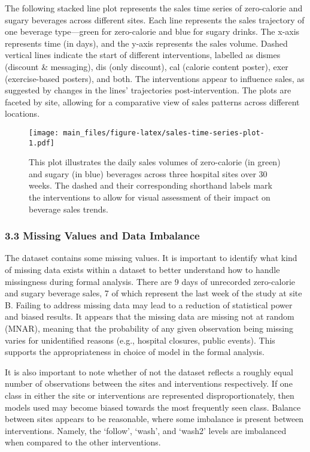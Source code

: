 \documentclass[
]{article}
\begin{document}
The following stacked line plot represents the sales time series of
zero-calorie and sugary beverages across different sites. Each line
represents the sales trajectory of one beverage type---green for
zero-calorie and blue for sugary drinks. The x-axis represents time (in
days), and the y-axis represents the sales volume. Dashed vertical lines
indicate the start of different interventions, labelled as dismes
(discount \& messaging), dis (only discount), cal (calorie content
poster), exer (exercise-based posters), and both. The interventions
appear to influence sales, as suggested by changes in the lines'
trajectories post-intervention. The plots are faceted by site, allowing
for a comparative view of sales patterns across different locations.

\begin{figure}
\centering
\texttt{[image: main\_files/figure-latex/sales-time-series-plot-1.pdf]}
\caption{This plot illustrates the daily sales volumes of zero-calorie
(in green) and sugary (in blue) beverages across three hospital sites
over 30 weeks. The dashed and their corresponding shorthand labels mark
the interventions to allow for visual assessment of their impact on
beverage sales trends.}
\end{figure}

\hypertarget{missing-values-and-data-imbalance}{%
\subsubsection{3.3 Missing Values and Data
Imbalance}\label{missing-values-and-data-imbalance}}

The dataset contains some missing values. It is important to identify
what kind of missing data exists within a dataset to better understand
how to handle missingness during formal analysis. There are 9 days of
unrecorded zero-calorie and sugary beverage sales, 7 of which represent
the last week of the study at site B. Failing to address missing data
may lead to a reduction of statistical power and biased results. It
appears that the missing data are missing not at random (MNAR), meaning
that the probability of any given observation being missing varies for
unidentified reasons (e.g., hospital closures, public events). This
supports the appropriateness in choice of model in the formal analysis.

It is also important to note whether of not the dataset reflects a
roughly equal number of observations between the sites and interventions
respectively. If one class in either the site or interventions are
represented disproportionately, then models used may become biased
towards the most frequently seen class. Balance between sites appears to
be reasonable, where some imbalance is present between interventions.
Namely, the `follow', `wash', and `wash2' levels are imbalanced when
compared to the other interventions.
\end{document}
